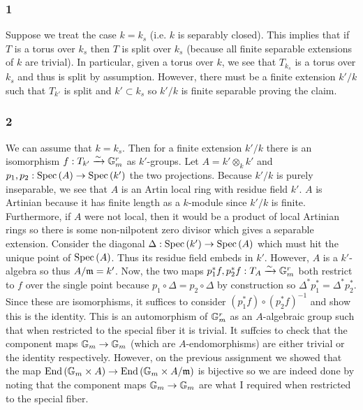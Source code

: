 \documentclass[12pt]{article}
\begin{document}
\subsubsection{1}

Suppose we treat the case $k = k_s$ (i.e. $k$ is separably closed). This implies that if $T$ is a torus over $k_s$ then $T$ is split over $k_s$ (because all finite separable extensions of $k$ are trivial). In particular, given a torus over $k$, we see that $T_{k_s}$ is a torus over $k_s$ and thus is split by assumption. However, there must be a finite extension $k'/k$ such that $T_{k'}$ is split and $k' \subset k_s$ so $k'/k$ is finite separable proving the claim.

\subsubsection{2}

We can assume that $k = k_s$. Then for a finite extension $k'/k$ there is an isomorphism $f : T_{k'} \xrightarrow{\sim} \mathbb{G}_m^r$ as $k'$-groups. Let $A = k' \otimes_k k'$ and $p_1, p_2 : \mathrm{Spec}\left( A \right) \to \mathrm{Spec}\left( k' \right)$ the two projections. Because $k'/k$ is purely inseparable, we see that $A$ is an Artin local ring with residue field $k'$. $A$ is Artinian because it has finite length as a $k$-module since $k'/k$ is finite. Furthermore, if $A$ were not local, then it would be a product of local Artinian rings so there is some non-nilpotent zero divisor which gives a separable extension. Consider the diagonal $\Delta  : \mathrm{Spec}\left( k' \right) \to \mathrm{Spec}\left( A \right)$ which must hit the unique point of $\mathrm{Spec}\left( A \right)$. Thus its residue field embeds in $k'$. However, $A$ is a $k'$-algebra so thus $A / \mathfrak{m} = k'$. Now, the two maps $p_1^* f, p_2^* f : T_A \xrightarrow{\sim} \mathbb{G}_m^r$ both restrict to $f$ over the single point because $p_1 \circ \Delta = p_2 \circ \Delta$ by construction so $\Delta^* p_1^* = \Delta^* p_2^*$.
\bigskip\\
Since these are isomorphisms, it suffices to consider $(p_1^* f) \circ (p_2^* f)^{-1}$ and show this is the identity. This is an automorphism of $\mathbb{G}_m^r$ as an $A$-algebraic group such that when restricted to the special fiber it is trivial. It suffcies to check that the component maps $\mathbb{G}_m \to \mathbb{G}_m$ (which are $A$-endomorphisms) are either trivial or the identity respectively. However, on the previous assignment we showed that the map $\mathrm{End}\left( \mathbb{G}_m \times A \right) \to \mathrm{End}\left( \mathbb{G}_m \times A / \mathfrak{m} \right)$ is bijective so we are indeed done by noting that the component maps $\mathbb{G}_m \to \mathbb{G}_m$ are what I required when restricted to the special fiber.
\end{document}
